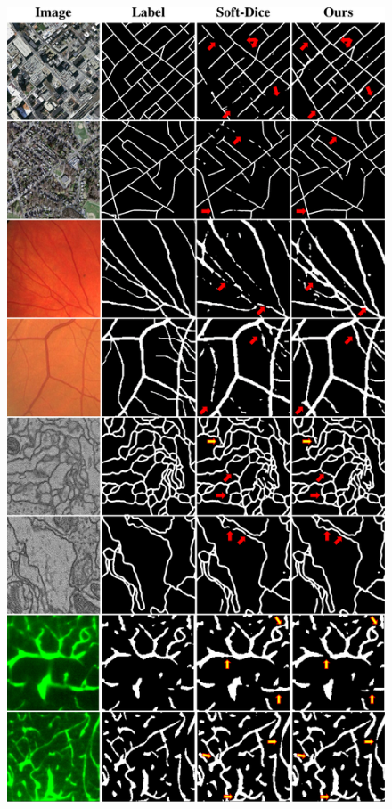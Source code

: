 \begin{figure}[ht!]

\includegraphics[width=0.98\linewidth]{figs/clDice_qualitative_results.pdf}


\end{figure}
